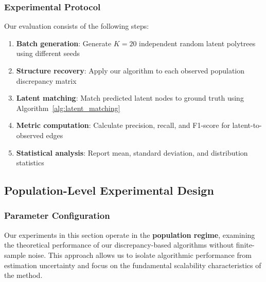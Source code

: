 \documentclass[11pt,a4paper]{article}
\numberwithin{equation}{section}
\begin{document}
\subsubsection{Experimental Protocol}

Our evaluation consists of the following steps:

\begin{enumerate}[label=(\arabic*)]
\item \textbf{Batch generation}: Generate $K = 20$ independent random latent polytrees using different seeds
\item \textbf{Structure recovery}: Apply our algorithm to each observed population discrepancy matrix
\item \textbf{Latent matching}: Match predicted latent nodes to ground truth using Algorithm~\ref{alg:latent_matching}
\item \textbf{Metric computation}: Calculate precision, recall, and F1-score for latent-to-observed edges
\item \textbf{Statistical analysis}: Report mean, standard deviation, and distribution statistics
\end{enumerate}



\subsection{Population-Level Experimental Design}

\subsubsection{Parameter Configuration}

Our experiments in this section operate in the \textbf{population regime}, examining the theoretical performance of our discrepancy-based algorithms without finite-sample noise. This approach allows us to isolate algorithmic performance from estimation uncertainty and focus on the fundamental scalability characteristics of the method.
\end{document}
